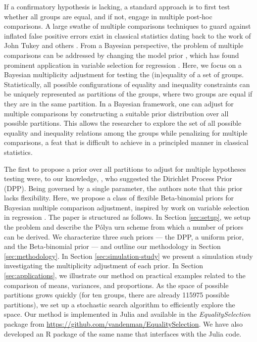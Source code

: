 \documentclass[11pt,a4paper]{article}
\theoremstyle{definition} %
\theoremstyle{case}
\begin{document}
If a confirmatory hypothesis is lacking, a standard approach is to first test whether all groups are equal, and if not, engage in multiple post-hoc comparisons. A large swathe of multiple comparisons techniques to guard against inflated false positive errors exist in classical statistics dating back to the work of John Tukey and others \parencite[][]{rao2009multiple, benjamini2002john}. From a Bayesian perspective, the problem of multiple comparisons can be addressed by changing the model prior \parencite[e.g.,][]{jeffreys1961theory, westfall1997bayesian, berry1999bayesian}, which has found prominent application in variable selection for regression \parencite[e.g.,][]{scott2006exploration, scott2010bayes}. Here, we focus on a Bayesian multiplicity adjustment for testing the (in)equality of a set of groups. Statistically, all possible configurations of equality and inequality constraints can be uniquely represented as partitions of the groups, where two groups are equal if they are in the same partition. In a Bayesian framework, one can adjust for multiple comparisons by constructing a suitable prior distribution over all possible partitions. This allows the researcher to explore the set of all possible equality and inequality relations among the groups while penalizing for multiple comparisons, a feat that is difficult to achieve in a principled manner in classical statistics.

The first to propose a prior over all partitions to adjust for multiple hypotheses testing were, to our knowledge, \textcite{gopalan1998bayesian}, who suggested the Dirichlet Process Prior (DPP). Being governed by a single parameter, the authors note that this prior lacks flexibility. Here, we propose a class of flexible Beta-binomial priors for Bayesian multiple comparison adjustment, inspired by work on variable selection in regression \parencite{scott2006exploration, scott2010bayes}. The paper is structured as follows. In Section \ref{sec:setup}, we setup the problem and describe the P\'{o}lya urn scheme from which a number of priors can be derived. We characterize three such priors --- the DPP, a uniform prior, and the Beta-binomial prior --- and outline our methodology in Section \ref{sec:methodology}. In Section \ref{sec:simulation-study} we present a simulation study investigating the multiplicity adjustment of each prior. In Section \ref{sec:applications}, we illustrate our method on practical examples related to the comparison of means, variances, and proportions. As the space of possible partitions grows quickly (for ten groups, there are already 115975 possible partitions), we set up a stochastic search algorithm to efficiently explore the space. Our method is implemented in Julia and available in the \textit{EqualitySelection} package from \url{https://github.com/vandenman/EqualitySelection}. We have also developed an R package of the same name that interfaces with the Julia code.
\end{document}
